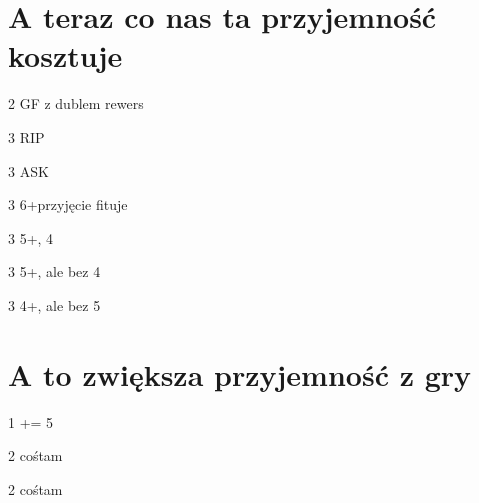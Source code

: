 \documentclass[12pt, a4paper]{article}
\begin{document}
\section*{A teraz co nas ta przyjemność kosztuje}
\sequence{{1\clubs}{1\hearts}}
\begin{options}[1]
    \item[2\nt] GF \bal z dublem \hearts \orr rewers \twosuit{\clubs}{\diams}
    \item[3\nt] RIP 
\end{options}

\begin{options}[2]
    \item[3\clubs] ASK
    \item[3\diams] 6+\hearts przyjęcie fituje
\end{options}

\begin{options}[1]
    \item[3\diams] 5+\clubs, 4\diams {}\hearts \lsf {}\nt \soff
    \item[3\hearts] 5+\clubs, ale bez 4\diams
    \item[3\spades] 4+\diams, ale bez 5\clubs 
\end{options}

\section*{A to zwiększa przyjemność z gry}

\begin{options}[1]
    \item[1\clubs] += 5
\end{options}

\sequence{{1\diams}{1\hearts}}
\begin{options}[1]
    \item[2\nt] cośtam
\end{options}

\sequence{{1\diams}{1\spades}}
\begin{options}[1]
    \item[2\nt] cośtam
\end{options}
\end{document}

